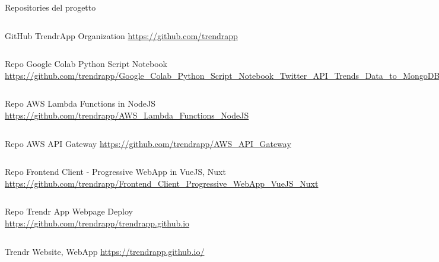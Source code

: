 \documentclass[xcolor=svgnames, aspectratio=169]{beamer}
\begin{document}
\begin{frame}{Repositories del progetto}
    \fontsize{7pt}{6}\selectfont
    \begin{columns}[c]
        \begin{block}{\fontsize{7pt}{6}\selectfont GitHub TrendrApp Organization}
            \url{https://github.com/trendrapp}
        \end{block}
    \end{columns}
    \begin{columns}[t]
        \begin{block}{\fontsize{7pt}{6}\selectfont Repo Google Colab Python Script Notebook}
            \url{https://github.com/trendrapp/Google_Colab_Python_Script_Notebook_Twitter_API_Trends_Data_to_MongoDB}
        \end{block}
    \end{columns}
    \begin{columns}[t]
        \begin{block}{\fontsize{7pt}{6}\selectfont Repo AWS Lambda Functions in NodeJS}
            \url{https://github.com/trendrapp/AWS_Lambda_Functions_NodeJS}
        \end{block}
    \end{columns}
    \begin{columns}[t]
        \begin{block}{\fontsize{7pt}{6}\selectfont Repo AWS API Gateway}
            \url{https://github.com/trendrapp/AWS_API_Gateway}
        \end{block}
    \end{columns}
    \begin{columns}[t]
        \begin{block}{\fontsize{7pt}{6}\selectfont Repo Frontend Client - Progressive WebApp in VueJS, Nuxt}
            \url{https://github.com/trendrapp/Frontend_Client_Progressive_WebApp_VueJS_Nuxt}
        \end{block}
    \end{columns}
    \begin{columns}[t]
        \begin{block}{\fontsize{7pt}{6}\selectfont Repo Trendr App Webpage Deploy}
            \url{https://github.com/trendrapp/trendrapp.github.io}
        \end{block}
    \end{columns}
    \begin{columns}[t]
        \begin{block}{\fontsize{7pt}{6}\selectfont Trendr Website, WebApp}
            \url{https://trendrapp.github.io/}
        \end{block}
    \end{columns}
\end{frame}
\end{document}
